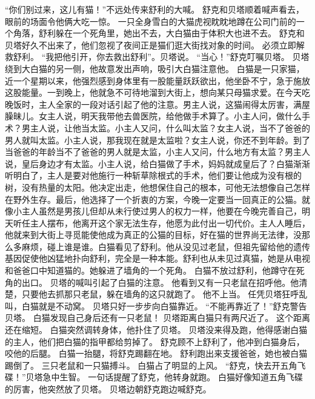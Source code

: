 \documentclass[a4paper,12pt,UTF8,twoside]{ctexbook}
\begin{document}
        “你们别过来，这儿有猫！”不远处传来舒利的大喊。 
        舒克和贝塔顺着喊声看去，眼前的场面令他俩大吃一惊。 
        一只全身雪白的大猫虎视眈眈地蹲在公司门前的一个角落，舒利躲在一个死角里，她出不去，大白猫由于体积大也进不去。 
        舒克和贝塔好久不出来了，他们忽视了夜间正是猫们逛大街找对象的时间。 
        必须立即解救舒利。 
        “我把他引开，你去救出舒利”。贝塔说。 
        “当心！”舒克叮嘱贝塔。 
        贝塔绕到大白猫的另一侧，他故意发出声响，吸引大白猫注意他。 
        白猫是一只家猫，近一个星期以来，他强烈感到身体里有一股能量跃跃欲出，他坐卧不宁，急于施放这股能量。一到晚上，他就急不可待地溜到大街上，想向某只母猫求爱。在今天吃晚饭时，主人全家的一段对话引起了他的注意。男主人说，这猫闹得太厉害，满屋臊昧儿。女主人说，明天我带他去兽医院，给他做手术算了。小主人问，做什么手术？男主人说，让他当太监。小主人又问，什么叫太监？女主人说，当不了爸爸的男人就叫太监。小主人说，那我现在就是太监啦？女主人说，你还不到年龄。到了当爸爸的年龄当不了爸爸的男人就是太监，小主人又问，什么地方有太监？男主人说，皇后身边才有太监。小主人说，给白猫做了手术，妈妈就成皇后了？白猫渐渐听明白了，主人是要对他施行一种斩草除根式的手术，他们要让他成为没有根的树，没有热量的太阳。他决定出走，他想保住自己的根本，可他无法想像自己怎样在野外生存。最后，他选择了一个折衷的方案，今晚一定要当一回真正的公猫。就像小主人虽然是男孩儿但却从未行使过男人的权力一样，他要在今晚完善自己，明天听任主人摆布，他离开这个家无法生存，他愿为此付出一切代价。主人人睡后，他就来到大街上寻觅能使他成为真正的公猫的目标，好在猫的世界尚无法律，没那么多麻烦，碰上谁是谁。白猫看见了舒利。他从没见过老鼠，但祖先留给他的遗传基因促使他凶猛地扑向舒利，完全是一种本能。舒利也从未见过真猫，她是从电视和爸爸口中知道猫的。她躲进了墙角的一个死角。 
        白猫不放过舒利，他蹲守在死角的出口。 
        贝塔的喊叫引起了白猫的注意。 
        他看到又有一只老鼠在招呼他。他清楚，只要他去抓那只老鼠，躲在墙角的这只就跑了。 
        他不上当。 
        任凭贝塔狂呼乱叫，白猫就是不动窝。 
        贝塔只好一步步向白猫靠近。 
        “不能再靠近了！”舒克警告贝塔。 
        白猫发现自己身后还有一只老鼠！ 
        贝塔距离白猫只有两尺近了。 
        这个距离还在缩短。 
        白猫突然调转身体，他扑住了贝塔。 
        贝塔没来得及跑，他得感谢白猫的主人，他们把白猫的指甲都给剪掉了。 
        舒克顾不上舒利了，他冲到白猫身后，咬他的后腿。 
        白猫一抬腿，将舒克踢翻在地。 
        舒利跑出来支援爸爸，她也被白猫踢倒了。 
        三只老鼠和一只猫搏斗。 
        白猫占了明显的上风。 
        “舒克，快去开五角飞碟！”贝塔急中生智。 
        一句话提醒了舒克，他转身就跑。 
        白猫好像知道五角飞碟的厉害，他突然放了贝塔。 
        贝塔边朝舒克跑边喊舒克。 
\end{document}
